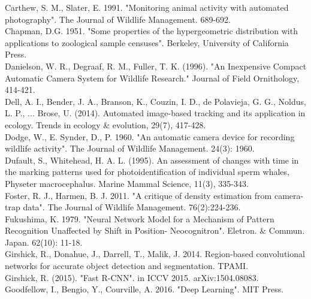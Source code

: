 \documentclass[11pt]{article}
\begin{document}
Carthew, S. M., Slater, E. 1991. "Monitoring animal activity with automated photography". The Journal of Wildlife Management. 689-692.
\newline
\\
Chapman, D.G. 1951. "Some properties of the hypergeometric distribution with applications to zoological sample censuses". Berkeley, University of California Press.
\newline
\\
Danielson, W. R., Degraaf, R. M., Fuller, T. K. (1996). "An Inexpensive Compact Automatic Camera System for Wildlife Research." Journal of Field Ornithology, 414-421.
\newline
\\
Dell, A. I., Bender, J. A., Branson, K., Couzin, I. D., de Polavieja, G. G., Noldus, L. P., ... Brose, U. (2014). Automated image-based tracking and its application in ecology. Trends in ecology \& evolution, 29(7), 417-428.
\newline
\\
Dodge, W., E. Synder, D., P. 1960. "An automatic camera device for recording wildlife activity". The Journal of Wildlife Management. 24(3): 1960.
\newline
\\
Dufault, S., Whitehead, H. A. L. (1995). An assessment of changes with time in the marking patterns used for photoidentification of individual sperm whales, Physeter macrocephalus. Marine Mammal Science, 11(3), 335-343.
\newline
\\
Foster, R. J., Harmen, B. J. 2011. "A critique of density estimation from camera-trap data". The Journal of Wildlife Management. 76(2):224-236.
\newline
\\
Fukushima, K. 1979. "Neural Network Model for a Mechanism of Pattern Recognition Unaffected by Shift in Position- Neocognitron". Eletron. \& Commun. Japan. 62(10): 11-18.
\newline
\\
Girshick, R., Donahue, J., Darrell, T., Malik, J. 2014. Region-based convolutional networks for accurate object detection and segmentation. TPAMI. 
\newline
\\
Girshick, R. (2015). "Fast R-CNN". in ICCV 2015. arXiv:1504.08083.
\newline
\\
Goodfellow, I., Bengio, Y., Courville, A. 2016. "Deep Learning". MIT Press.
\newline
\end{document}
